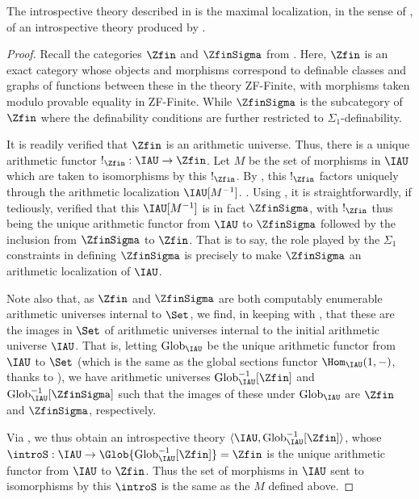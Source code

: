 \begin{theorem}
The introspective theory described in  is the maximal localization, in the sense of , of an introspective theory produced by .
\end{theorem}
\begin{proof}
Recall the categories $\Zfin$ and $\ZfinSigma$ from . Here, $\Zfin$ is an exact category whose objects and morphisms correspond to definable classes and graphs of functions between these in the theory ZF-Finite, with morphisms taken modulo provable equality in ZF-Finite. While $\ZfinSigma$ is the subcategory of $\Zfin$ where the definability conditions are further restricted to $\Sigma_1$-definability.

It is readily verified that $\Zfin$ is an arithmetic universe. Thus, there is a unique arithmetic functor $!_{\Zfin} : \IAU \to \Zfin$. Let $M$ be the set of morphisms in $\IAU$ which are taken to isomorphisms by this $!_{\Zfin}$. By , this $!_{\Zfin}$ factors uniquely through the arithmetic localization $\IAU[M^{-1}]$. . Using , it is straightforwardly, if tediously, verified that this $\IAU[M^{-1}]$ is in fact $\ZfinSigma$, with $!_{\Zfin}$ thus being the unique arithmetic functor from $\IAU$ to $\ZfinSigma$ followed by the inclusion from $\ZfinSigma$ to $\Zfin$. That is to say, the role played by the $\Sigma_1$ constraints in defining $\ZfinSigma$ is precisely to make $\ZfinSigma$ an arithmetic localization of $\IAU$.

\newcommand{\IAUGlob}{\mathrm{Glob}_{\IAU}}
Note also that, as $\Zfin$ and $\ZfinSigma$ are both computably enumerable arithmetic universes internal to $\Set$, we find, in keeping with , that these are the images in $\Set$ of arithmetic universes internal to the initial arithmetic universe $\IAU$. That is, letting $\IAUGlob$ be the unique arithmetic functor from $\IAU$ to $\Set$ (which is the same as the global sections functor $\Hom_{\IAU}(1, -)$, thanks to ), we have arithmetic universes $\IAUGlob^{-1}[\Zfin]$ and $\IAUGlob^{-1}[\ZfinSigma]$ such that the images of these under $\IAUGlob$ are $\Zfin$ and $\ZfinSigma$, respectively.

Via , we thus obtain an introspective theory $\langle \IAU, \IAUGlob^{-1}[\Zfin] \rangle$, whose $\introS : \IAU \to \Glob{\IAUGlob^{-1}[\Zfin]} = \Zfin$ is the unique arithmetic functor from $\IAU$ to $\Zfin$. Thus the set of morphisms in $\IAU$ sent to isomorphisms by this $\introS$ is the same as the $M$ defined above.


\end{proof}
